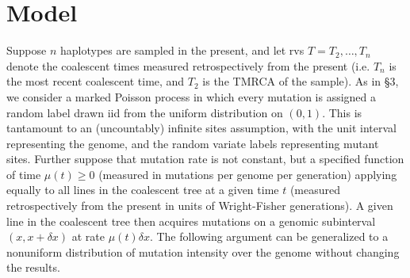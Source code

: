 \documentclass[11pt]{article}
\begin{document}
\section*{Model}\label{sec:model}

Suppose $n$ haplotypes are sampled in the present, and let rvs $T = T_2,\dots,T_n$ denote the coalescent times measured retrospectively from the present (i.e. $T_n$ is the most recent coalescent time, and $T_2$ is the TMRCA of the sample).
As in \cite{Griffiths1998-qf} \S3, we consider a marked Poisson process in which every mutation is assigned a random label drawn iid from the uniform distribution on $(0,1)$.
This is tantamount to an (uncountably) infinite sites assumption, with the unit interval representing the genome, and the random variate labels representing mutant sites.
Further suppose that mutation rate is not constant, but a specified function of time $\mu(t) \ge 0$ (measured in mutations per genome per generation) applying equally to all lines in the coalescent tree at a given time $t$ (measured retrospectively from the present in units of Wright-Fisher generations).
A given line in the coalescent tree then acquires mutations on a genomic subinterval $(x,x+\delta x)$ at rate $\mu(t)\delta x$.
The following argument can be generalized to a nonuniform distribution of mutation intensity over the genome without changing the results.
\end{document}
